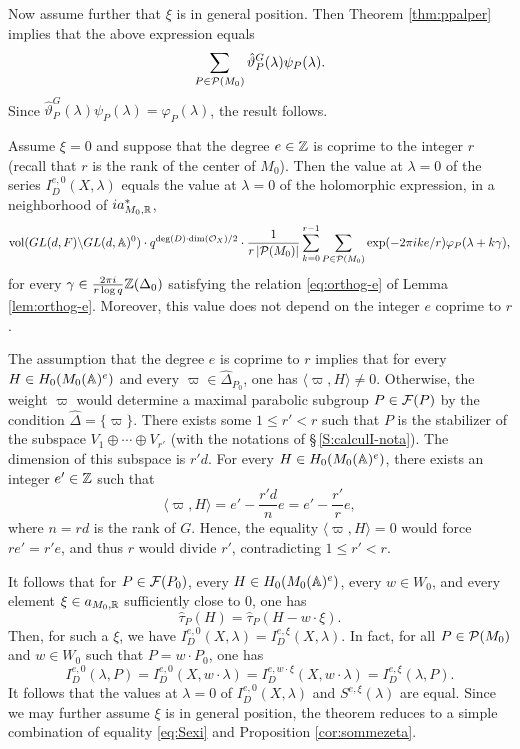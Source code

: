 \begin{paragr}
\begin{paragr}
\begin{preuve}
Now assume further that $\xi$ is in general position. Then Theorem \ref{thm:ppalper} implies that the above expression equals
$$\sum_{P\in \mathcal{P}(M_0)} \hat{\vartheta}_P^G(\lambda)\psi_P(\lambda).$$
Since $\hat{\vartheta}_P^G(\lambda)\psi_P(\lambda)=\varphi_P(\lambda)$, the result follows.
\end{preuve}

\begin{theoreme}\label{cor:sommezeta2}
Assume $\xi=0$ and suppose that the degree $e\in \mathbb{Z}$ is coprime to the integer $r$ (recall that $r$ is the rank of the center of $M_0$). Then the value at $\lambda=0$ of the series $I^{e,0}_D(X,\lambda)$ equals the value at $\lambda=0$ of the holomorphic expression, in a neighborhood of $ia^*_{M_0,\mathbb{R}}$,
$$ \operatorname{vol}(GL(d,F)\backslash GL(d,\mathbb{A})^0) \cdot q^{\deg(D)\cdot  \dim(\mathcal{O}_X)/2}\cdot \frac{1}{r\, |\mathcal{P}(M_0)|}\sum_{k=0}^{r-1} \sum_{P\in \mathcal{P}(M_0)} \exp(-2\pi i k e/r) \varphi_P(\lambda+k\gamma),$$
for every $\gamma\in \frac{2\pi i }{r \log q } \mathbb{Z}(\Delta_0)$ satisfying the relation \eqref{eq:orthog-e} of Lemma \ref{lem:orthog-e}.
Moreover, this value does not depend on the integer $e$ coprime to $r$.
\end{theoreme}

\begin{preuve}
The assumption that the degree $e$ is coprime to $r$ implies that for every $H\in H_0(M_0(\mathbb{A})^e)$ and every $\varpi\in \hat{\Delta}_{P_0}$, one has  $\langle \varpi,H\rangle\neq 0$. Otherwise, the weight $\varpi$ would determine a maximal parabolic subgroup $P\in \mathcal{F}(P)$ by the condition $\hat{\Delta}=\{\varpi\}$. There exists some $1\leq r'<r$ such that $P$ is the stabilizer of the subspace $V_1\oplus\cdots\oplus V_{r'}$ (with the notations of \S\,\ref{S:calculI-nota}). The dimension of this subspace is $r'd$. For every $H\in H_0(M_0(\mathbb{A})^e)$, there exists an integer $e'\in \mathbb{Z}$ such that 
$$\langle \varpi,H\rangle= e'-\frac{r'd}{n} e = e'-\frac{r'}{r}e,$$
where $n=rd$ is the rank of $G$. Hence, the equality $\langle \varpi,H\rangle=0$ would force $re'=r'e$, and thus $r$ would divide $r'$, contradicting $1\leq r'<r$.

It follows that for $P\in \mathcal{F}(P_0)$, every $H\in H_0(M_0(\mathbb{A})^e)$, every $w\in W_0$, and every element $\xi\in a_{M_0,\mathbb{R}}$ sufficiently close to $0$, one has 
$$\hat{\tau}_P(H)=\hat{\tau}_P(H-w\cdot \xi).$$
Then, for such a $\xi$, we have $I^{e,0}_D(X,\lambda)=I^{e,\xi}_D(X,\lambda)$. In fact, for all $P\in \mathcal{P}(M_0)$ and $w\in W_0$ such that $P=w\cdot P_0$, one has 
$$I^{e,0}_D(\lambda,P)= I^{e,0}_D(X,w\cdot\lambda)= I^{e,w\cdot\xi}_D(X,w\cdot\lambda)=I^{e,\xi}_D(\lambda,P).$$
It follows that the values at $\lambda=0$ of $I^{e,0}_D(X,\lambda)$ and $S^{e,\xi}(\lambda)$ are equal. Since we may further assume $\xi$ is in general position, the theorem reduces to a simple combination of equality \eqref{eq:Sexi} and Proposition \ref{cor:sommezeta}.
\end{preuve}


\end{paragr}
\end{paragr}
